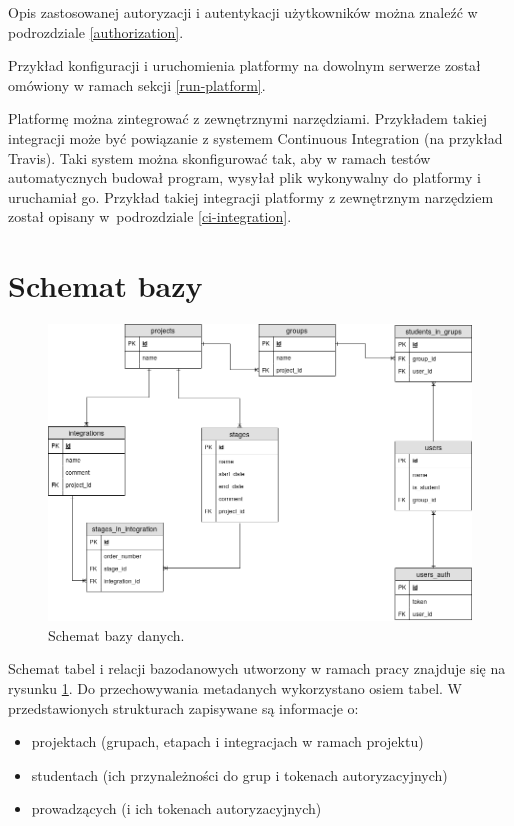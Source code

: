 Opis zastosowanej autoryzacji i autentykacji użytkowników można znaleźć w podrozdziale \ref{authorization}.

Przykład konfiguracji i uruchomienia platformy na dowolnym serwerze został omówiony w ramach sekcji \ref{run-platform}.

Platformę można zintegrować z zewnętrznymi narzędziami.
Przykładem takiej integracji może być powiązanie z systemem Continuous Integration (na przykład Travis).
Taki system można skonfigurować tak, aby w ramach testów automatycznych budował program, wysyłał plik wykonywalny do platformy i uruchamiał go.
Przykład takiej integracji platformy z zewnętrznym narzędziem został opisany w~podrozdziale \ref{ci-integration}.

\section{Schemat bazy}
\label{database}

\begin{figure}[h]
    \centering
    \includegraphics[width = 13cm]{chapter05/db_schema.png}
    \caption{Schemat bazy danych.}
    \label{fig:platform-db-schema}
\end{figure}

Schemat tabel i relacji bazodanowych utworzony w ramach pracy znajduje się na rysunku \ref{fig:platform-db-schema}.
Do przechowywania metadanych wykorzystano osiem tabel.
W przedstawionych strukturach zapisywane są informacje o:
\begin{itemize}
    \item projektach (grupach, etapach i integracjach w ramach projektu)
    \item studentach (ich przynależności do grup i tokenach autoryzacyjnych)
    \item prowadzących (i ich tokenach autoryzacyjnych)
\end{itemize}

